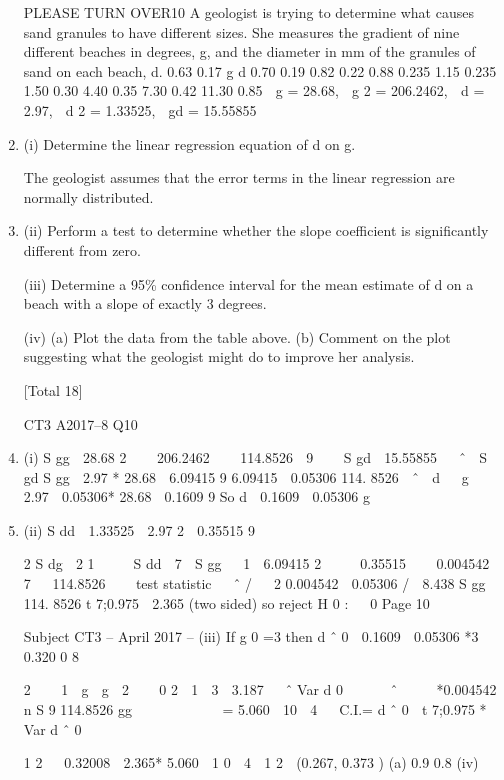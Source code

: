 \documentclass[a4paper,12pt]{article}
\begin{document}
\begin{enumerate}
PLEASE TURN OVER10
A geologist is trying to determine what causes sand granules to have different sizes.
She measures the gradient of nine different beaches in degrees, g, and the diameter in
mm of the granules of sand on each beach, d.
0.63
0.17
g
d
0.70
0.19
0.82
0.22
0.88
0.235
1.15
0.235
1.50
0.30
4.40
0.35
7.30
0.42
11.30
0.85
 g = 28.68,  g 2 = 206.2462,  d = 2.97,  d 2 = 1.33525,  gd = 15.55855
\item (i)
Determine the linear regression equation of d on g.

The geologist assumes that the error terms in the linear regression are normally
distributed.
\item (ii)
Perform a test to determine whether the slope coefficient is significantly
different from zero.

(iii) Determine a 95\% confidence interval for the mean estimate of d on a beach
with a slope of exactly 3 degrees.

(iv) (a)
Plot the data from the table above.
(b)
Comment on the plot suggesting what the geologist might do to
improve her analysis.

[Total 18]

CT3 A2017–8
Q10
\item (i)
S gg

28.68 2 
  206.2462 
  114.8526

9  

S gd  15.55855 
 ˆ 
S gd
S gg

2.97 * 28.68
 6.09415
9
6.09415
 0.05306
114. 8526
 ˆ  d   g 
2.97  0.05306* 28.68
 0.1609
9
So d  0.1609  0.05306 g
\item (ii)
S dd  1.33525 
2.97 2
 0.35515
9





2
S dg
 2 1 
   S dd 
7 
S gg
  1 
6.09415 2 
   0.35515 
  0.004542
 7  
114.8526  
 
test statistic   ˆ / 
 2
0.004542
 0.05306 /
 8.438
S gg
114. 8526 
t 7;0.975  2.365 (two sided) so reject H 0 :   0
Page 10

Subject CT3  – April 2017 – %
(iii)
If g 0 =3 then d ˆ 0  0.1609  0.05306 *3  0.320 0 8

2 
  1  g  g  2  

0
2  1  3  3.187  
ˆ
Var d 0   
  ˆ   
 *0.004542
n
S
9
114.8526
gg
 
 
 
 
 
= 5.060  10  4
 
C.I.= d ˆ 0  t 7;0.975 * Var d ˆ 0

1
2

 0.32008  2.365* 5.060  1 0  4

1
2
 (0.267, 0.373 )
(a)
0.9
0.8
(iv)


\end{enumerate}
\end{document}
